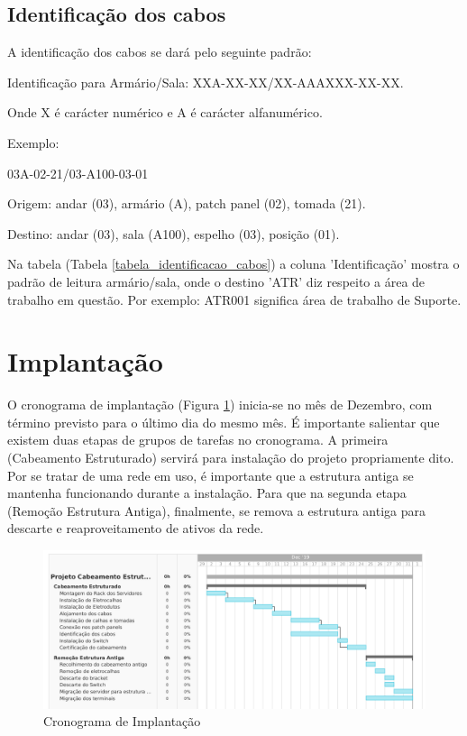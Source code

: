 \documentclass[	DIV=calc,%
							paper=a4,%
							fontsize=12pt,%
							onecolumn]{scrartcl}	 					%
\begin{document}
\subsection{Identificação dos cabos}

A identificação dos cabos se dará pelo seguinte padrão: \newline

Identificação para Armário/Sala: \newline
 XXA-XX-XX/XX-AAAXXX-XX-XX.\newline

Onde X é carácter numérico e A é carácter alfanumérico.\newline

Exemplo: 

03A-02-21/03-A100-03-01\newline

Origem: andar (03), armário (A), patch panel (02), tomada (21).

Destino: andar (03), sala (A100), espelho (03), posição (01).\newline

Na tabela (Tabela \ref{tabela_identificacao_cabos}) a coluna 'Identificação' mostra o padrão de leitura armário/sala, onde o destino 'ATR' diz respeito a área de trabalho em questão. Por exemplo: ATR001 significa área de trabalho de Suporte.

\newpage


\section{Implantação}

O cronograma de implantação (Figura \ref{cronograma}) inicia-se no mês de Dezembro, com término previsto para o último dia do mesmo mês. É importante salientar que existem duas etapas de grupos de tarefas no cronograma. A primeira (Cabeamento Estruturado) servirá para instalação do projeto propriamente dito. Por se tratar de uma rede em uso, é importante que a estrutura antiga se mantenha funcionando durante a instalação. Para que na segunda etapa (Remoção Estrutura Antiga), finalmente, se remova a estrutura antiga para descarte e reaproveitamento de ativos da rede.

\begin{figure}[H]
	\centering
	\includegraphics[width=\textwidth]{cronograma}
	\caption{Cronograma de Implantação}
	\label{cronograma}
\end{figure}
\end{document}
